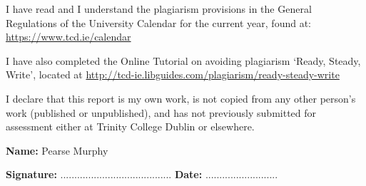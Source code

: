 \begin{abstracts}
\end{abstracts}


\restoregeometry





\begin{declaration}      

I have read and I understand the plagiarism provisions in the General Regulations of the University Calendar for the current year, found at: \url{https://www.tcd.ie/calendar}

I have also completed the Online Tutorial on avoiding plagiarism ‘Ready, Steady, Write’, located at \url{http://tcd-ie.libguides.com/plagiarism/ready-steady-write}  

\vspace{10mm}

I declare that this report is my own work, is not copied from any other person's work (published or unpublished), and has not previously submitted for assessment either at Trinity College Dublin or elsewhere.

\vspace{30mm}

\textbf{Name:} Pearse Murphy

\vspace{15mm}

\textbf{Signature:}  ........................................		\textbf{Date:}  ..........................

\end{declaration}

